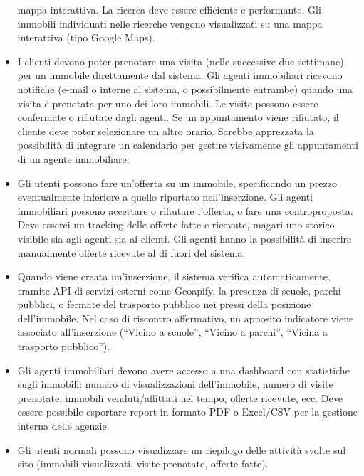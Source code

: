 \begin{itemize}
                mappa interattiva. La ricerca deve essere efficiente e performante. Gli immobili individuati nelle
                ricerche vengono visualizzati su una mappa interattiva (tipo Google Maps).
                \item I clienti devono poter prenotare una visita (nelle successive due settimane) per un immobile
                direttamente dal sistema. Gli agenti immobiliari ricevono notifiche (e-mail o interne al sistema, o
                possibilmente entrambe) quando una visita è prenotata per uno dei loro immobili. Le visite
                possono essere confermate o rifiutate dagli agenti. Se un appuntamento viene rifiutato, il cliente
                deve poter selezionare un altro orario. Sarebbe apprezzata la possibilità di integrare un calendario
                per gestire visivamente gli appuntamenti di un agente immobiliare.
                \item Gli utenti possono fare un’offerta su un immobile, specificando un prezzo eventualmente inferiore
                a quello riportato nell’inserzione. Gli agenti immobiliari possono accettare o rifiutare l'offerta, o
                fare una controproposta. Deve esserci un tracking delle offerte fatte e ricevute, magari uno storico
                visibile sia agli agenti sia ai clienti. Gli agenti hanno la possibilità di inserire manualmente offerte
                ricevute al di fuori del sistema.
                \item Quando viene creata un’inserzione, il sistema verifica automaticamente, tramite API di servizi
                esterni come Geoapify, la presenza di scuole, parchi pubblici, o fermate del trasporto pubblico nei
                pressi della posizione dell’immobile. Nel caso di riscontro affermativo, un apposito indicatore
                viene associato all’inserzione (“Vicino a scuole”, “Vicino a parchi”, “Vicina a trasporto pubblico”).
                \item Gli agenti immobiliari devono avere accesso a una dashboard con statistiche sugli immobili:
                numero di visualizzazioni dell’immobile, numero di visite prenotate, immobili venduti/affittati nel
                tempo, offerte ricevute, ecc. Deve essere possibile esportare report in formato PDF o Excel/CSV
                per la gestione interna delle agenzie.
                \item Gli utenti normali possono visualizzare un riepilogo delle attività svolte sul sito (immobili
                visualizzati, visite prenotate, offerte fatte).


            
        \end{itemize}

